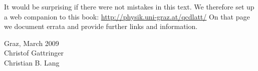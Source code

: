It would be surprising if there were not mistakes in this text. We
therefore set up a web companion to this book: \url{http://physik.uni-graz.at/qcdlatt/}
On that page we document errata and provide further links and
information.

\begin{flushright}
Graz, March 2009\\[2mm]
Christof Gattringer\\[1mm]
Christian B. Lang
\end{flushright}
